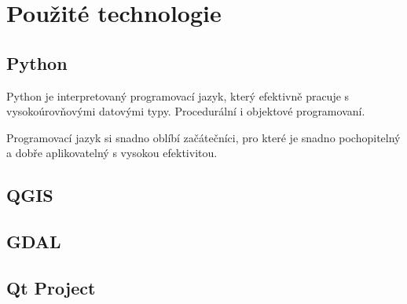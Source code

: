 \chapter{Použité technologie}
\label{3-technologie}

\section{Python}

Python je interpretovaný programovací jazyk, který efektivně pracuje s vysokoúrovňovými datovými typy. Procedurální i objektové programovaní. 

Programovací jazyk si snadno oblíbí začátečníci, pro které je snadno pochopitelný a dobře aplikovatelný s vysokou efektivitou.
\section{QGIS}
  
\section{GDAL}

\section{Qt Project}


